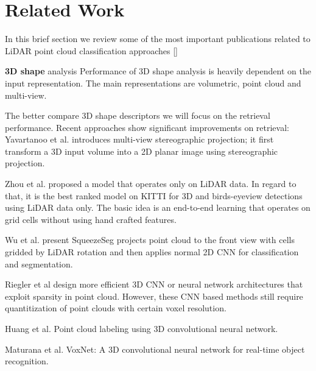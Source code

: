 \section{Related Work}\label{sec:relatedWork}

In this brief section we review some of the most important publications related to LiDAR point cloud classification approaches []

\textbf{3D shape} analysis Performance of 3D shape analysis is heavily dependent on the input representation. The main representations are volumetric, point cloud and multi-view.

The better compare 3D shape descriptors we will focus on the retrieval performance. Recent approaches show significant improvements on retrieval: Yavartanoo et al. \cite{DBLP:journals/corr/abs-1811-01571} introduces multi-view stereographic projection; it first transform a 3D input volume into a 2D planar image using stereographic projection.

Zhou et al. \cite{Zhou_2018_CVPR} proposed a model that operates only on LiDAR data. In regard to that, it is the best ranked model on KITTI \cite{geiger2012we} for 3D and birds-eyeview detections using LiDAR data only. The basic idea is an end-to-end learning that operates on grid cells without using hand crafted features.

Wu et al. \cite{DBLP:conf/icra/WuWYK18} present SqueezeSeg projects point cloud to the front view with cells gridded by LiDAR rotation and then applies normal 2D CNN
for classification and segmentation. 

Riegler et al \cite{DBLP:conf/cvpr/RieglerUG17} design more efficient 3D CNN or neural network architectures that exploit sparsity in point cloud. However, these CNN based methods still require quantitization of point clouds with certain voxel resolution.








 

Huang et al. \cite{DBLP:conf/icpr/HuangY16}  Point cloud labeling using 3D convolutional neural network. 


Maturana et al. \cite{DBLP:conf/iros/MaturanaS15}  VoxNet: {A} 3D convolutional neural network for real-time object recognition.




